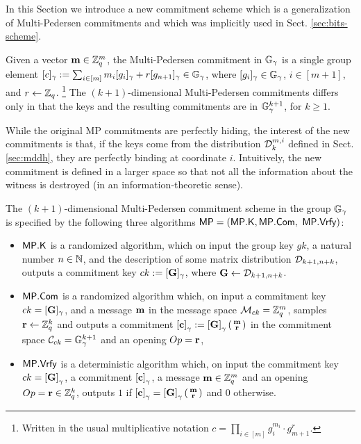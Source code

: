 In this Section we introduce a new commitment scheme which is a generalization of Multi-Pedersen commitments and which was implicitly used in Sect. \ref{sec:bits-scheme}. 

Given a vector $\mathbf{m}\in\mathbb{Z}_q^m$, the Multi-Pedersen commitment in $\mathbb{G}_{\gamma}$ is a single group element $[c]_\gamma:=\sum_{i\in [m]} m_i[g_i]_\gamma+r[g_{n+1}]_\gamma \in\mathbb{G}_\gamma$, where $[g_i]_{\gamma}\in\mathbb{G}_\gamma$, $i\in[m+1]$, and $r\gets\mathbb{Z}_q$. \footnote{Written in the usual multiplicative notation $c=\prod_{i\in[m]}g_i^{m_i} \cdot g_{m+1}^r$.}  The $(k+1)$-dimensional Multi-Pedersen commitments 
differs only in that the keys and the resulting commitments are in 
$\mathbb{G}_{\gamma}^{k+1}$, for $k\geq 1$. 


While the original MP commitments are perfectly hiding, the interest of the new commitments is that, if the keys come from the distribution $\mathcal{D}_k^{m,i}$ defined in Sect. \ref{sec:mddh}, they are perfectly binding at coordinate $i$. Intuitively, the new commitment is defined in a larger space so that not all the information about the witness is destroyed (in an information-theoretic sense). 

\begin{definition} The $(k+1)$-dimensional Multi-Pedersen commitment scheme in the group $\mathbb{G}_\gamma$ 
is specified by the following three algorithms 
	$\mathsf{MP}=(\mathsf{MP}.\mathsf{K},\mathsf{MP}.\mathsf{Com},$ $ \mathsf{MP}.\mathsf{Vrfy})$:
	\begin{itemize} 
		\item  $\mathsf{MP}.\mathsf{K}$ is a randomized algorithm, which on input the group key $gk$, a natural number $n \in \mathbb{N}$, and the description of some matrix distribution $\mathcal{D}_{k+1,n+k}$, 
		outputs a commitment key $ck:=[\mathbf{{G}}]_\gamma$, where $\mathbf{{G}} \gets \mathcal{D}_{k+1,n+k}$.
		\item $\mathsf{MP}.\mathsf{Com}$ is a randomized algorithm which, on input a commitment key $ck=[\mathbf{{G}}]_\gamma$, and a message 
		$\mathbf{m}$ in the message space $\mathcal{M}_{ck}=\mathbb{Z}_q^{m}$, samples $\mathbf{r} \gets \mathbb{Z}_q^k$ and outputs a commitment $\left[\mathbf{c}\right]_\gamma:=\left[\mathbf{{G}}\right]_\gamma\left(\begin{smallmatrix}\mathbf{m} \\ \mathbf{r}\end{smallmatrix}\right)$ in the commitment space $\mathcal{C}_{ck}=\mathbb{G}_\gamma^{k+1}$ and an opening $Op=\mathbf{r}$, 
		\item $\mathsf{MP}.\mathsf{Vrfy}$ is a deterministic algorithm which, on input the commitment key $ck=\left[\mathbf{{G}}\right]_\gamma$, a commitment $\left[\mathbf{c}\right]_\gamma$,  a message 
		$\mathbf{m} \in \mathbb{Z}_q^{m}$ and an opening $Op=\mathbf{r}\in\mathbb{Z}_q^k$, outputs $1$ if $\left[\mathbf{c}\right]_\gamma=\left[\mathbf{{G}}\right]_\gamma\left(\begin{smallmatrix}\mathbf{m} \\ \mathbf{r}\end{smallmatrix}\right)$
		and $0$ otherwise. 
	\end{itemize}
\end{definition}

